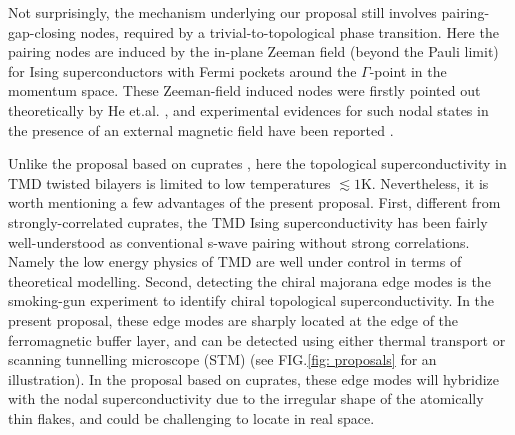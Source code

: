 Not surprisingly, the mechanism underlying our proposal still involves pairing-gap-closing nodes, required by a trivial-to-topological phase transition. Here the pairing nodes are induced by the in-plane Zeeman field (beyond the Pauli limit) for Ising superconductors with Fermi pockets around the $\Gamma$-point in the momentum space. These Zeeman-field induced nodes were firstly pointed out theoretically by He et.al. \cite{he2018magnetic}, and experimental evidences for such nodal states in the presence of an external magnetic field have been reported \cite{xi2016ising,xing2017ising,de2018tuning,navarro2016enhanced}. 

Unlike the proposal based on cuprates \cite{can2021high,song2021doping}, here the topological superconductivity in TMD twisted bilayers is limited to low temperatures $\lesssim 1$K. Nevertheless, it is worth mentioning a few advantages of the present proposal. First, different from strongly-correlated cuprates, the TMD Ising superconductivity has been fairly well-understood as conventional s-wave pairing without strong correlations. Namely the low energy physics of TMD are well under control in terms of theoretical modelling. Second, detecting the chiral majorana edge modes is the smoking-gun experiment to identify chiral topological superconductivity. In the present proposal, these edge modes are sharply located at the edge of the ferromagnetic buffer layer, and can be detected using either thermal transport or scanning tunnelling microscope (STM) (see FIG.\ref{fig: proposals} for an illustration). In the proposal based on cuprates, these edge modes will hybridize with the nodal superconductivity due to the irregular shape of the atomically thin flakes, and could be challenging to locate in real space. 


